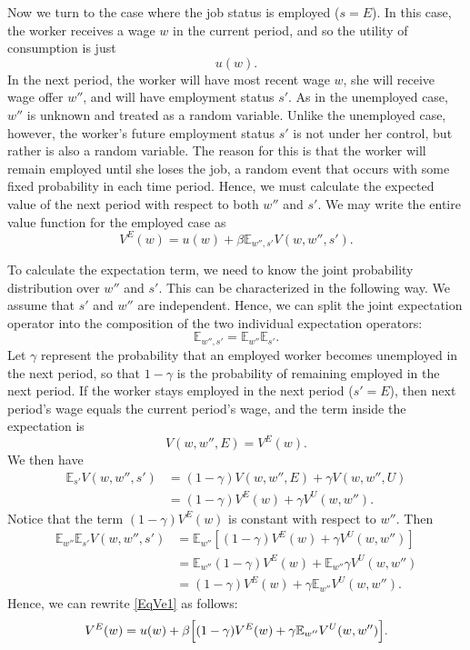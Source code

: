 Now we turn to the case where the job status is employed ($s = E$).
In this case, the worker receives a wage $w$ in the current period, and so the utility of consumption is
just
\[
u(w).
\]
In the next period, the worker will have most recent wage $w$, she will receive wage offer $w''$, and will
have employment status $s'$. As in the unemployed case, $w''$ is unknown and treated as a random variable.
Unlike the unemployed case, however, the worker's future employment status $s'$ is not under her control,
but rather is also a random variable. The reason for this is that the worker will remain employed
until she loses the job, a random event that occurs with some fixed probability in each time period.
Hence, we must calculate the expected value of the next period with respect to both $w''$ and $s'$.
We may write the entire value function for the employed case as
\begin{equation}\label{EqVe1}
   V^E(w) = u(w) + \beta \mathbb{E}_{w'',s'}V(w,w'',s').
\end{equation}

To calculate the expectation term, we need to know the joint probability distribution over $w''$ and $s'$.
This can be characterized in the following way.
We assume that $s'$ and $w''$ are independent. Hence, we can split the joint expectation
operator into the composition of the two individual expectation operators:
\[
\mathbb{E}_{w'',s'} = \mathbb{E}_{w''}\mathbb{E}_{s'}.
\]
Let $\gamma$ represent the probability that an employed worker becomes unemployed in the next period,
so that $1-\gamma$ is the probability of remaining employed in the next period.
If the worker stays employed in the next period ($s' = E$), then next period's wage equals the current
period's wage, and the term inside the expectation is
\[
V(w,w'',E) = V^E(w).
\]
We then have
\begin{align*}
\mathbb{E}_{s'}V(w,w'',s') &= (1-\gamma)V(w,w'',E) + \gamma V(w,w'',U)\\
&= (1-\gamma)V^E(w) + \gamma V^U(w,w'').
\end{align*}
Notice that the term $(1-\gamma)V^E(w)$ is constant with respect to $w''$. Then
\begin{align*}
\mathbb{E}_{w''}\mathbb{E}_{s'}V(w,w'',s') &= \mathbb{E}_{w''}\left[(1-\gamma)V^E(w) + \gamma V^U(w,w'')\right]\\
&= \mathbb{E}_{w''}(1-\gamma)V^E(w) + \mathbb{E}_{w''}\gamma V^U(w,w'')\\
&= (1-\gamma)V^E(w) + \gamma \mathbb{E}_{w''}V^U(w,w'').
\end{align*}
Hence, we can rewrite \eqref{EqVe1} as follows:
\begin{equation}\label{EqVe2}
   V^E(w) = u(w) + \beta \Bigl[(1-\gamma)V^E(w) + \gamma \mathbb{E}_{w''}V^U(w,w'')\Bigr].
\end{equation}

